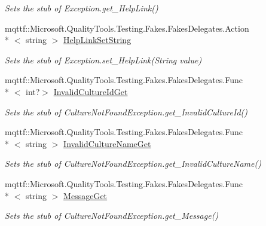 \begin{DoxyCompactItemize}
\begin{DoxyCompactList}\small\item\em Sets the stub of Exception.\-get\-\_\-\-Help\-Link()\end{DoxyCompactList}\item 
mqttf\-::\-Microsoft.\-Quality\-Tools.\-Testing.\-Fakes.\-Fakes\-Delegates.\-Action\\*
$<$ string $>$ \hyperlink{class_system_1_1_globalization_1_1_fakes_1_1_stub_culture_not_found_exception_a09acfd525aa0cb30ee9d8d223a3ab79b}{Help\-Link\-Set\-String}
\begin{DoxyCompactList}\small\item\em Sets the stub of Exception.\-set\-\_\-\-Help\-Link(\-String value)\end{DoxyCompactList}\item 
mqttf\-::\-Microsoft.\-Quality\-Tools.\-Testing.\-Fakes.\-Fakes\-Delegates.\-Func\\*
$<$ int?$>$ \hyperlink{class_system_1_1_globalization_1_1_fakes_1_1_stub_culture_not_found_exception_a954a72f0016db2ae7f5920f66e76f314}{Invalid\-Culture\-Id\-Get}
\begin{DoxyCompactList}\small\item\em Sets the stub of Culture\-Not\-Found\-Exception.\-get\-\_\-\-Invalid\-Culture\-Id()\end{DoxyCompactList}\item 
mqttf\-::\-Microsoft.\-Quality\-Tools.\-Testing.\-Fakes.\-Fakes\-Delegates.\-Func\\*
$<$ string $>$ \hyperlink{class_system_1_1_globalization_1_1_fakes_1_1_stub_culture_not_found_exception_aff35fe2ae68d486256c3fa44f7fc2351}{Invalid\-Culture\-Name\-Get}
\begin{DoxyCompactList}\small\item\em Sets the stub of Culture\-Not\-Found\-Exception.\-get\-\_\-\-Invalid\-Culture\-Name()\end{DoxyCompactList}\item 
mqttf\-::\-Microsoft.\-Quality\-Tools.\-Testing.\-Fakes.\-Fakes\-Delegates.\-Func\\*
$<$ string $>$ \hyperlink{class_system_1_1_globalization_1_1_fakes_1_1_stub_culture_not_found_exception_ac6b9ffea37c4eb3e1cc53471d0ad76ad}{Message\-Get}
\begin{DoxyCompactList}\small\item\em Sets the stub of Culture\-Not\-Found\-Exception.\-get\-\_\-\-Message()\end{DoxyCompactList}\item 

\end{DoxyCompactItemize}
